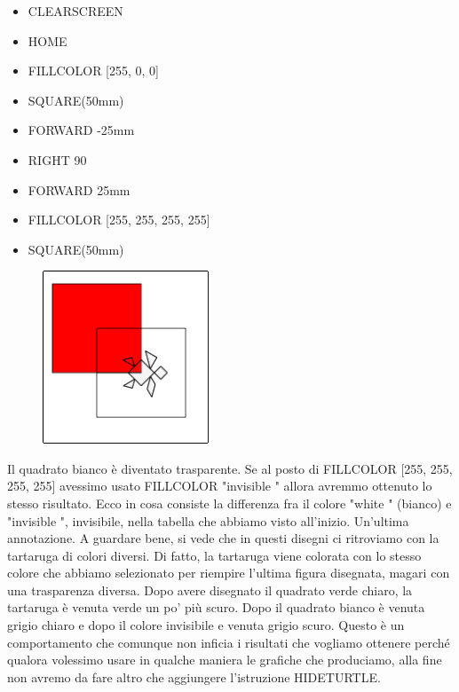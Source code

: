 \vskip 1cm

\begin{scriptsize}
\begin{minipage}{0.40\textwidth}
\begin{itemize}[itemsep=-3pt,parsep=2pt]
\item[] CLEARSCREEN
\item[] HOME
\item[] FILLCOLOR [255, 0, 0]                                
\item[] SQUARE(50mm)
\item[] FORWARD -25mm
\item[] RIGHT 90                                             
\item[] FORWARD 25mm
\item[] FILLCOLOR [255, 255, 255, 255]
\item[] SQUARE(50mm)                                        
\end{itemize}
\end{minipage}
\end{scriptsize}
\begin{minipage}{0.4\textwidth}
\begin{figure}[H]
   \includegraphics[width=5.0cm,trim=4 4 8 4,clip]{./images/disegnare/disegnare-19.png}
   \label{dis-18}
\end{figure}
\end{minipage} \hfill

\vskip 1cm

Il quadrato bianco è diventato trasparente. Se al posto di FILLCOLOR [255, 255, 255, 255] avessimo usato FILLCOLOR  "invisible " allora avremmo ottenuto lo stesso risultato. Ecco in cosa consiste la differenza fra il colore  "white " (bianco) e  "invisible ", invisibile, nella tabella che abbiamo visto all'inizio. 
Un'ultima annotazione. A guardare bene, si vede che in questi disegni ci ritroviamo con la tartaruga di colori diversi. Di fatto, la tartaruga viene colorata con lo stesso colore che abbiamo selezionato per riempire l'ultima figura disegnata, magari con una trasparenza diversa. Dopo avere disegnato il quadrato verde chiaro, la tartaruga è venuta verde un po' più scuro. Dopo il quadrato bianco è venuta grigio chiaro e dopo il colore invisibile e venuta grigio scuro. Questo è un comportamento che comunque non inficia i risultati che vogliamo ottenere perché qualora volessimo usare in qualche maniera le grafiche che produciamo, alla fine non avremo da fare altro che aggiungere l'istruzione HIDETURTLE.

